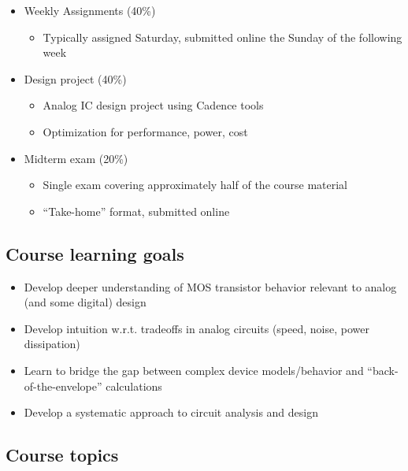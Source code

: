 \documentclass[11pt]{article}
\providecommand{\tightlist}{%
      \setlength{\itemsep}{0pt}\setlength{\parskip}{0pt}}
\begin{document}
    \begin{itemize}
\tightlist
\item
  Weekly Assignments (40\%)

  \begin{itemize}
  \tightlist
  \item
    Typically assigned Saturday, submitted online the Sunday of the
    following week
  \end{itemize}
\item
  Design project (40\%)

  \begin{itemize}
  \tightlist
  \item
    Analog IC design project using Cadence tools
  \item
    Optimization for performance, power, cost
  \end{itemize}
\item
  Midterm exam (20\%)

  \begin{itemize}
  \tightlist
  \item
    Single exam covering approximately half of the course material
  \item
    ``Take-home'' format, submitted online
  \end{itemize}
\end{itemize}

    \hypertarget{course-learning-goals}{%
\subsection{Course learning goals}\label{course-learning-goals}}

    \begin{itemize}
\tightlist
\item
  Develop deeper understanding of MOS transistor behavior relevant to
  analog (and some digital) design
\item
  Develop intuition w.r.t. tradeoffs in analog circuits (speed, noise,
  power dissipation)
\item
  Learn to bridge the gap between complex device models/behavior and
  ``back-of-the-envelope'' calculations
\item
  Develop a systematic approach to circuit analysis and design
\end{itemize}

    \hypertarget{course-topics}{%
\subsection{Course topics}\label{course-topics}}
\end{document}
